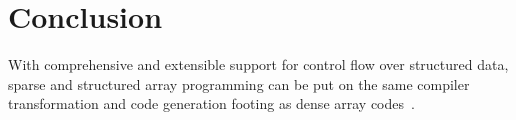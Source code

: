 \section{Conclusion}
With comprehensive and extensible support for control flow over structured data,
sparse and structured array programming can be put on
the same compiler transformation and code generation footing as dense array
codes~\cite{fred-taco}.